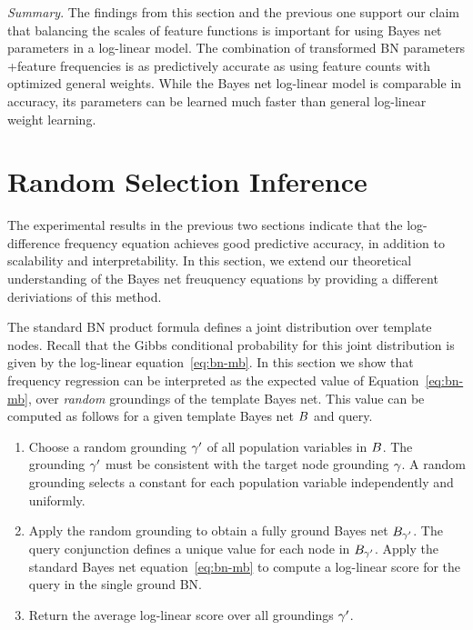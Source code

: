 \documentclass[twoside,11pt]{article}
\newcommand{\point}[1]{\noindent\emph{#1}.}
\begin{document}
\point{Summary} 
The findings from this section and the previous one support our claim that balancing the scales of feature functions is important for using Bayes net parameters in a log-linear model. The combination of  transformed BN parameters +feature frequencies  is as predictively accurate as using feature counts with optimized general weights.
While the Bayes net log-linear model is comparable in accuracy, its parameters can be learned much faster than general log-linear weight learning.
%

 
 


\section{Random Selection Inference} \label{sec:random}


The experimental results in the previous two sections indicate that the log-difference frequency equation achieves good predictive accuracy, in addition to scalability and interpretability. In this section, we extend our theoretical understanding of the Bayes net freuquency equations by providing a different deriviations of this method. 

The standard BN product formula defines a joint distribution over template nodes. Recall that the Gibbs conditional probability for this joint distribution is given by the log-linear equation~\ref{eq:bn-mb}. 
In this section we show that frequency regression can be interpreted as the expected value of Equation~\ref{eq:bn-mb}, over {\em random} groundings of the template Bayes net. This value can be computed as follows for a given template Bayes net $B$ and query.

\begin{enumerate}
\item Choose a random grounding $\gamma'$ of all population variables in $B$. The grounding $\gamma'$ must be consistent with the target node grounding $\gamma$. A random grounding selects a constant for each population variable independently and uniformly.
\item Apply the random grounding to obtain a fully ground Bayes net $B_{\gamma'}$. The query conjunction defines a unique value for each node in $B_{\gamma'}$. Apply the standard Bayes net equation~\ref{eq:bn-mb} to compute a log-linear score for the query in the single ground BN.
\item Return the average log-linear score over all groundings $\gamma'$.
\end{enumerate}
\end{document}
